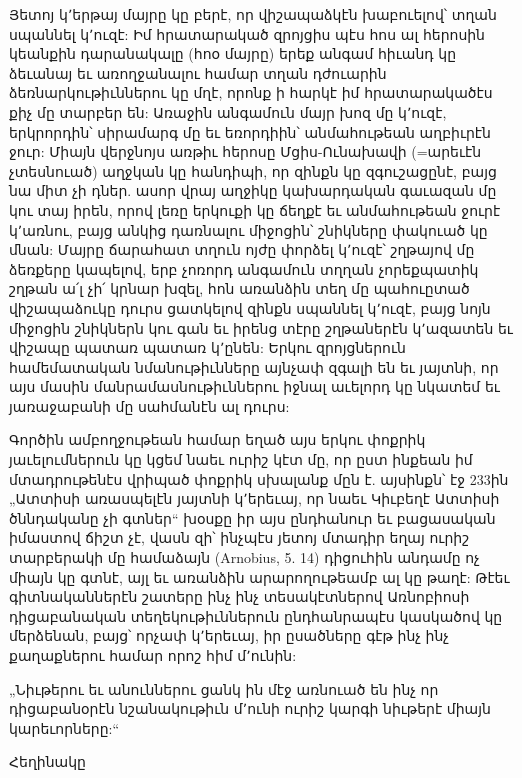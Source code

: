 \documentclass{article}
\begin{document}
{Յետոյ կ՚երթայ մայրը կը բերէ, որ վիշապաձկէն խաբուելով՝ տղան սպաննել կ՚ուզէ: Իմ հրատարակած զրոյցիս պէս հոս ալ հերոսին կեանքին դարանակալը (հոօ մայրը) երեք անգամ հիւանդ կը ձեւանայ եւ առողջանալու համար տղան դժուարին ձեռնարկութիւններու կը մղէ, որոնք ի հարկէ իմ հրատարակածէս քիչ մը տարբեր են: Առաջին անգամուն մայր խոզ մը կ՚ուզէ, երկրորդին՝ սիրամարգ մը եւ եռորդիին՝ անմահութեան աղբիւրէն ջուր: Միայն վերջնոյս առթիւ հերոսը Մցիս-Ունախավի (=արեւէն չտեսնուած) աղջկան կը հանդիպի, որ զինքն կը զգուշացընէ, բայց նա միտ չի դներ. ասոր վրայ աղջիկը կախարդական գաւազան մը կու տայ իրեն, որով լեռը երկուքի կը ճեղքէ եւ անմահութեան ջուրէ կ՚առնու, բայց անկից դառնալու միջոցին՝ շնիկները փակուած կը մնան: Մայրը ճարահատ տղուն ոյժը փորձել կ՚ուզէ՝ շղթայով մը ձեռքերը կապելով, երբ չոռորդ անգամուն տղղան չորեքպատիկ շղթան ա՛լ չի՛ կրնար խզել, հոն առանձին տեղ մը պահուըտած վիշապաձուկը դուրս ցատկելով զինքն սպաննել կ՚ուզէ, բայց նոյն միջոցին շնիկներն կու գան եւ իրենց տէրը շղթաներէն կ՚ազատեն եւ վիշապը պատառ պատառ կ՚ընեն: Երկու զրոյցներուն համեմատական նմանութիւնները այնչափ զգալի են եւ յայտնի, որ այս մասին մանրամասնութիւններու իջնալ աւելորդ կը նկատեմ եւ յառաջաբանի մը սահմանէն ալ դուրս:

Գործին ամբողջութեան համար եղած այս երկու փոքրիկ յաւելումներուն կը կցեմ նաեւ ուրիշ կէտ մը, որ ըստ ինքեան իմ մտադրութենէս վրիպած փոքրիկ սխալանք մըն է. այսինքն՝ էջ 233ին „Ատտիսի առասպելէն յայտնի կ՚երեւայ, որ նաեւ Կիւբեղէ Ատտիսի ծննդականը չի գտներ“ խօսքը իր այս ընդհանուր եւ բացասական իմաստով ճիշտ չէ, վասն զի՝ ինչպէս յետոյ մտադիր եղայ ուրիշ տարբերակի մը համաձայն (Arnobius, 5. 14) դիցուհին անդամը ոչ միայն կը գտնէ, այլ եւ առանձին արարողութեամբ ալ կը թաղէ: Թէեւ գիտնականներէն շատերը ինչ ինչ տեսակէտներով Առնոբիոսի դիցաբանական տեղեկութիւններուն ընդհանրապէս կասկածով կը մերձենան, բայց՝ որչափ կ՚երեւայ, իր ըսածները գէթ ինչ ինչ քաղաքներու համար որոշ հիմ մ՚ունին:

„Նիւթերու եւ անուններու ցանկ ին մէջ առնուած են ինչ որ դիցաբանօրէն նշանակութիւն մ՚ունի ուրիշ կարգի նիւթերէ միայն կարեւորները:“

\bigskip

Հեղինակը
}
\clearpage
\section*{}
\paragraph{}
\clearpage
\section{}
\end{document}
